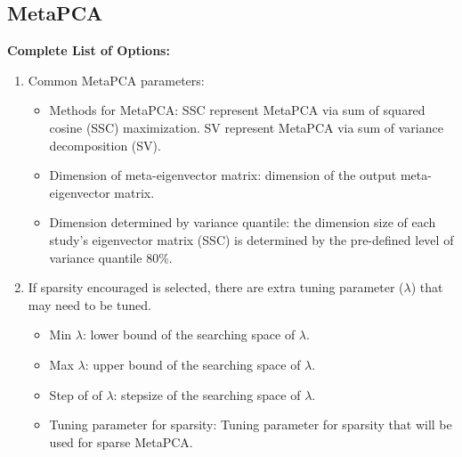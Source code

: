 \subsection{MetaPCA}
\label{sec:completeList_MetaPCA}

\textbf{Complete List of Options:} 
\begin{enumerate}
\item Common MetaPCA parameters: 

\begin{itemize}
\item Methods for MetaPCA:
SSC represent MetaPCA via sum of squared cosine (SSC) maximization.
SV represent MetaPCA via sum of variance decomposition (SV).
\item Dimension of meta-eigenvector matrix: dimension of the output meta-eigenvector matrix.
\item Dimension determined by variance quantile:
the dimension size of each study's eigenvector matrix (SSC) is determined  by the pre-defined level of variance quantile 80\%.
\end{itemize}

\item If sparsity encouraged is selected, there are extra tuning parameter ($\lambda$) that may need to be tuned.

\begin{itemize}
\item  Min $\lambda$: lower bound of the searching space of $\lambda$.
\item Max $\lambda$: upper bound of the searching space of $\lambda$.
\item Step of of $\lambda$: stepsize of the searching space of $\lambda$.
\item Tuning parameter for sparsity: Tuning parameter for sparsity that will be used for sparse MetaPCA.
\end{itemize}


\end{enumerate}


